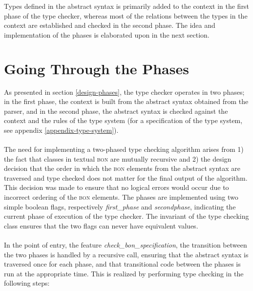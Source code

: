 Types defined in the abstract syntax is primarily added to the context in the first phase of the type checker, whereas most of the relations between the types in the context are established and checked in the second phase. The idea and implementation of the phases is elaborated upon in the next section.

\section{Going Through the Phases}
\label{implementation-phases}
As presented in section \ref{design-phases}, the type checker operates in two phases; in the first phase, the context is built from the abstract syntax obtained from the parser, and in the second phase, the abstract syntax is checked against the context and the rules of the type system (for a specification of the type system, see appendix \ref{appendix-type-system}).
\paragraph{} %
The need for implementing a two-phased type checking algorithm arises from 1) the fact that classes in textual \textsc{bon} are mutually recursive and 2) the design decision that the order in which the \textsc{bon} elements from the abstract syntax are traversed and type checked does not matter for the final output of the algorithm. This decision was made to ensure that no logical errors would occur due to incorrect ordering of the \textsc{bon} elements.
The phases are implemented using two simple boolean flags, respectively \textit{first\_phase} and \textit{second\textunderscore phase}, indicating the current phase of execution of the type checker. The invariant of the type checking class ensures that the two flags can never have equivalent values.

\paragraph{}
In the point of entry, the feature \textit{check\_bon\_specification}, the transition between the two phases is handled by a recursive call, ensuring that the abstract syntax is traversed once for each phase, and that transitional code between the phases is run at the appropriate time. This is realized by performing type checking in the following steps:

